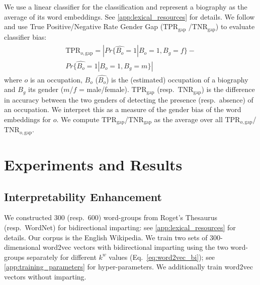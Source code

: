 \documentclass[11pt,a4paper]{article}
\begin{document}

We use a linear classifier for the classification and
represent a biography as the average of its word
embeddings. See \ref{app:lexical_resources} for details.
We follow \citet{hardt16equality} and use
True Positive/Negative
Rate Gender Gap ($\text{TPR}_{\text{gap}}$
/$\text{TNR}_{\text{gap}}$) to evaluate classifier bias:
\begin{align}
\begin{split}
    \label{eq:TPR}
\text{TPR}_{o,\text{gap}} \!=\!     |Pr\{\hat{B_o}\!=\!1|B_o\!=\!1,B_g\!=\!f\} -\\ Pr\{\hat{B_o}\!=\!1|B_o\!=\!1,B_g\!=\!m\}|
\end{split}
\end{align}
where $o$ is an occupation,
$B_o$ ($\hat{B_o}$) is the (estimated) occupation of a
biography and $B_g$ its gender ($m$/$f$ = male/female).
$\text{TPR}_{\text{gap}}$
(resp.\ $\text{TNR}_{\text{gap}}$)
is the
difference in accuracy between the two genders of
detecting the presence (resp.\ absence) of an occupation.
We interpret this as a measure of the gender bias of the
word embeddings for $o$.
  We compute
  $\text{TPR}_{\text{gap}}$/$\text{TNR}_{\text{gap}}$ as the average over all
  $\text{TPR}_{o,\text{gap}}$/$\text{TNR}_{o,\text{gap}}$.

\section{Experiments and Results} \label{sec:results}

\subsection{Interpretability Enhancement}

We constructed 300 (resp.\ 600) word-groups from Roget's
Thesaurus (resp.\ WordNet) for bidirectional imparting: see \ref{app:lexical_resources} for details. 
Our corpus is the English Wikipedia.
We train two sets of 300-dimensional word2vec vectors with bidirectional imparting using
the two word-groups separately for
different $k^w$ values (Eq.\ 
\ref{eq:word2vec_bi}); see \ref{app:training_parameters} for hyper-parameters. We additionally train word2vec vectors without imparting.
\end{document}
